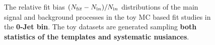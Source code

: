 \begin{figure}[!hbtp]
{} 

\caption{The relative fit bias $(N_{\text fit} - N_{\text in})/N_{\text in}$ distributions 
of the main signal and background processes in the toy MC based fit studies in the {\bf 0-Jet bin}. 
The toy datasets are generated sampling {\bf both statistics of the templates and systematic nusiances}. }
\label{fig:toyfit_0j}
\end{figure}


